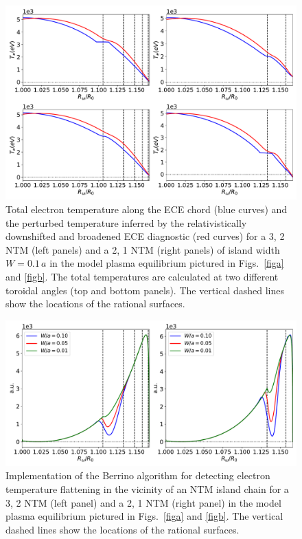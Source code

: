 \documentclass[12pt,prb,aps]{revtex4-1}
\begin{document}
\begin{figure}
\centerline{\includegraphics[width=\textwidth]{Fig16.pdf}}
\caption{Total electron temperature along the ECE chord (blue curves) and the perturbed temperature inferred by the relativistically downshifted and broadened ECE diagnostic (red curves) for a
3, 2 NTM (left panels) and a 2, 1 NTM (right panels) of island width $W=0.1\,a$  in the model plasma equilibrium pictured in Figs.~\ref{figa} and \ref{figb}.
The total temperatures are calculated  at two different toroidal angles (top and bottom panels).  The vertical dashed lines show the locations of the rational surfaces. \label{fig14}}
\end{figure}

\begin{figure}
\centerline{\includegraphics[width=\textwidth]{Fig17.pdf}}
\caption{Implementation of the Berrino algorithm for detecting electron temperature flattening  in the vicinity of an NTM island chain  for a 3, 2  NTM (left panel) and a 2, 1 NTM (right panel) in the model plasma equilibrium pictured in Figs.~\ref{figa} and \ref{figb}. The vertical dashed lines show the locations of the rational surfaces. \label{fig15}}
\end{figure}
\end{document}
